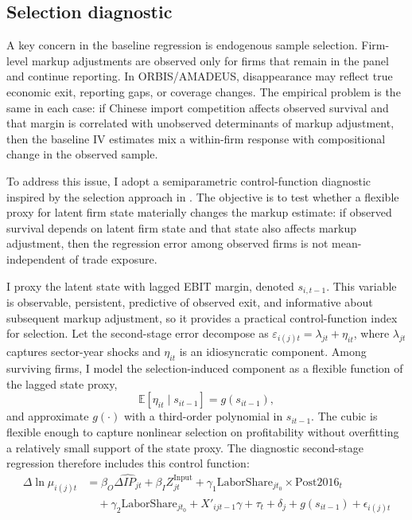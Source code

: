 ﻿\documentclass[12pt]{article}
\begin{document}
\subsection{Selection diagnostic}
\label{sec:selection}

A key concern in the baseline regression is endogenous sample selection. Firm-level markup adjustments are observed only for firms that remain in the panel and continue reporting. In ORBIS/AMADEUS, disappearance may reflect true economic exit, reporting gaps, or coverage changes. The empirical problem is the same in each case: if Chinese import competition affects observed survival and that margin is correlated with unobserved determinants of markup adjustment, then the baseline IV estimates mix a within-firm response with compositional change in the observed sample.

To address this issue, I adopt a semiparametric control-function diagnostic inspired by the selection approach in \textcite{backusWhyProductivityCorrelated2020,pavcnikTradeLiberalizationExit2002}. The objective is to test whether a flexible proxy for latent firm state materially changes the markup estimate: if observed survival depends on latent firm state and that state also affects markup adjustment, then the regression error among observed firms is not mean-independent of trade exposure.

I proxy the latent state with lagged EBIT margin, denoted $s_{i,t-1}$. This variable is observable, persistent, predictive of observed exit, and informative about subsequent markup adjustment, so it provides a practical control-function index for selection. Let the second-stage error decompose as $\varepsilon_{i(j)t} = \lambda_{jt} + \eta_{it}$, where $\lambda_{jt}$ captures sector-year shocks and $\eta_{it}$ is an idiosyncratic component. Among surviving firms, I model the selection-induced component as a flexible function of the lagged state proxy,
\[
\mathbb{E}[\eta_{it} \mid s_{it-1}] = g(s_{it-1}),
\]
and approximate $g(\cdot)$ with a third-order polynomial in $s_{it-1}$. The cubic is flexible enough to capture nonlinear selection on profitability without overfitting a relatively small support of the state proxy. The diagnostic second-stage regression therefore includes this control function:
\begin{equation}
\begin{aligned}
\Delta \ln \mu_{i(j)t} &= \beta_O \widehat{\Delta IP_{jt}} + \beta_I Z_{jt}^{\text{Input}} + \gamma_1 \text{LaborShare}_{jt_0} \times \text{Post2016}_t \\
&\quad + \gamma_2 \text{LaborShare}_{jt_0} + X'_{ijt-1} \gamma + \tau_t + \delta_j + g(s_{it-1}) + \epsilon_{i(j)t}
\end{aligned}
\end{equation}
\end{document}
